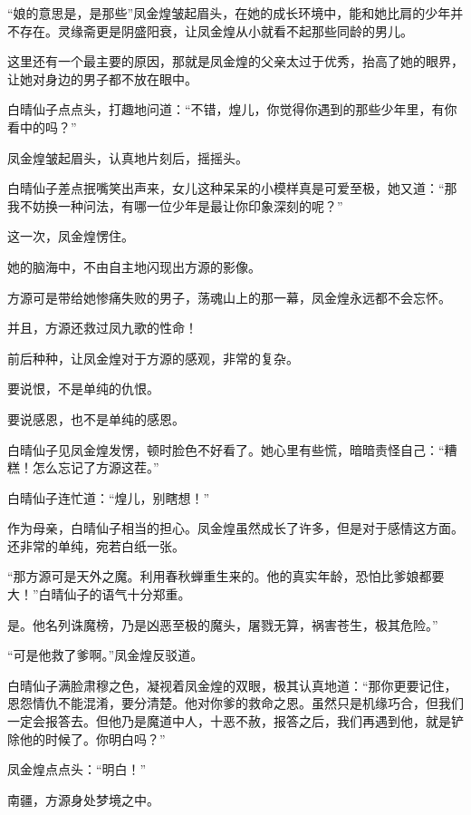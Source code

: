 
\begin{this_body}



“娘的意思是，是那些”凤金煌皱起眉头，在她的成长环境中，能和她比肩的少年并不存在。灵缘斋更是阴盛阳衰，让凤金煌从小就看不起那些同龄的男儿。

这里还有一个最主要的原因，那就是凤金煌的父亲太过于优秀，抬高了她的眼界，让她对身边的男子都不放在眼中。

白晴仙子点点头，打趣地问道：“不错，煌儿，你觉得你遇到的那些少年里，有你看中的吗？”

凤金煌皱起眉头，认真地片刻后，摇摇头。

白晴仙子差点抿嘴笑出声来，女儿这种呆呆的小模样真是可爱至极，她又道：“那我不妨换一种问法，有哪一位少年是最让你印象深刻的呢？”

这一次，凤金煌愣住。

她的脑海中，不由自主地闪现出方源的影像。

方源可是带给她惨痛失败的男子，荡魂山上的那一幕，凤金煌永远都不会忘怀。

并且，方源还救过凤九歌的性命！

前后种种，让凤金煌对于方源的感观，非常的复杂。

要说恨，不是单纯的仇恨。

要说感恩，也不是单纯的感恩。

白晴仙子见凤金煌发愣，顿时脸色不好看了。她心里有些慌，暗暗责怪自己：“糟糕！怎么忘记了方源这茬。”

白晴仙子连忙道：“煌儿，别瞎想！”

作为母亲，白晴仙子相当的担心。凤金煌虽然成长了许多，但是对于感情这方面。还非常的单纯，宛若白纸一张。

“那方源可是天外之魔。利用春秋蝉重生来的。他的真实年龄，恐怕比爹娘都要大！”白晴仙子的语气十分郑重。

是。他名列诛魔榜，乃是凶恶至极的魔头，屠戮无算，祸害苍生，极其危险。”

“可是他救了爹啊。”凤金煌反驳道。

白晴仙子满脸肃穆之色，凝视着凤金煌的双眼，极其认真地道：“那你更要记住，恩怨情仇不能混淆，要分清楚。他对你爹的救命之恩。虽然只是机缘巧合，但我们一定会报答去。但他乃是魔道中人，十恶不赦，报答之后，我们再遇到他，就是铲除他的时候了。你明白吗？”

凤金煌点点头：“明白！”

南疆，方源身处梦境之中。


\end{this_body}
